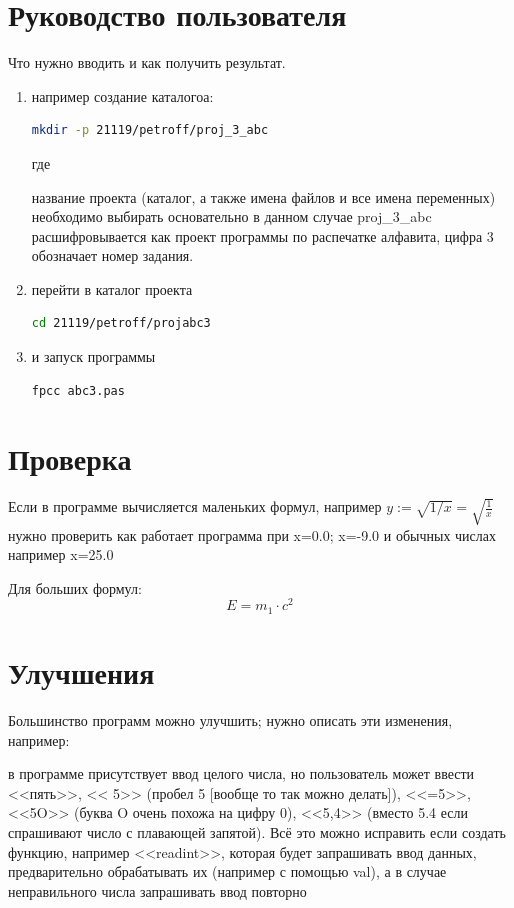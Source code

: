 \section{Руководство пользователя}
Что нужно вводить и как получить результат.
\begin{enumerate}
\item например создание каталогоа:

\begin{lstlisting}[language=bash]
mkdir -p 21119/petroff/proj_3_abc
\end{lstlisting}
  
  где 
  название проекта (каталог, а также имена файлов и все имена
  переменных) необходимо выбирать основательно в данном случае
  proj\_3\_abc расшифровывается как проект программы по распечатке
  алфавита, цифра 3 обозначает номер задания.

\item перейти в каталог проекта
  \begin{lstlisting}[language=bash]
    cd 21119/petroff/projabc3
  \end{lstlisting}

\item и запуск программы
  \begin{lstlisting}[language=bash]
    fpcc abc3.pas
  \end{lstlisting}

\end{enumerate}
\section{Проверка}
Если в программе вычисляется маленьких формул, например $y:=\sqrt{1/x} = \sqrt{\frac{1}{x}}$ нужно
  проверить как работает программа при x=0.0; x=-9.0 и обычных числах например x=25.0

Для больших формул:
\begin{equation}
E = m_1 \cdot c^2
\end{equation}

\section{Улучшения}
Большинство программ можно улучшить; нужно
  описать эти изменения, например:

  в программе присутствует ввод целого числа,
  но пользователь может ввести
  <<пять>>,
  << 5>> (пробел 5 [вообще то так можно делать]),
  <<=5>>,
  <<5O>> (буква O очень похожа на цифру 0),
  <<5,4>> (вместо 5.4 если спрашивают число с плавающей запятой).
  Всё это можно исправить если создать функцию, например <<readint>>,
  которая будет запрашивать ввод данных, предварительно обрабатывать
  их (например с помощью val), а в случае неправильного числа
  запрашивать ввод повторно


